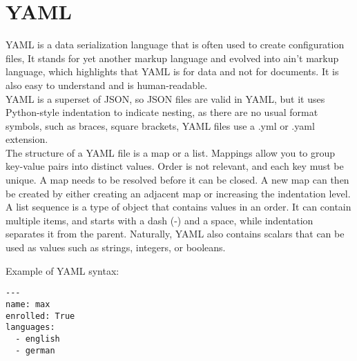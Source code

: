 \section{YAML}
YAML is a data serialization language that is often used to create configuration files,
It stands for yet another markup language and evolved into ain’t markup language,  which highlights that YAML is for data and not for documents. It is also easy to understand and is human-readable.\\
YAML is a superset of JSON, so JSON files are valid in YAML, but it uses Python-style indentation to indicate nesting, as there are no usual format symbols, such as braces, square brackets, YAML files use a .yml or .yaml extension.\\
The structure of a YAML file is a map or a list.
Mappings allow you to group key-value pairs into distinct values. Order is not relevant, and each key must be unique. A map needs to be resolved before it can be closed. A new map can then be created by either creating an adjacent map or increasing the indentation level.\\
A list sequence is a type of object that contains values in an order. It can contain multiple items, and starts with a dash (-) and a space, while indentation separates it from the parent.
Naturally, YAML also contains scalars that can be used as values such as strings, integers, or booleans\cite{yaml_redhat}.

Example of YAML syntax:

\begin{lstlisting}[caption=YAML example, style=pythonstyle]
---
name: max
enrolled: True
languages:
  - english
  - german

\end{lstlisting}
